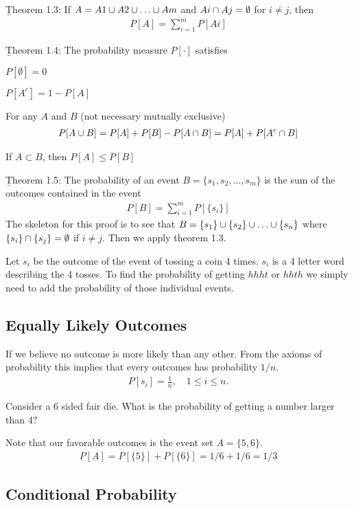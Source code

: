 \documentclass[12pt, titlepage, oneside]{article}
\begin{document}
\b{Theorem 1.3}: If $A = A1 \u A2 \u \dots \u Am$ and $Ai \cap Aj = \emptyset$ for $i \neq j$, then
\begin{align}
P[A] = \sum_{i=1}^m P[Ai]
\end{align}

\b{Theorem 1.4}: The probability measure $P[\cdot]$ satisfies
\items
\item $P[\emptyset] = 0$
\item $P[A^c] = 1-P[A]$
\item For any $A$ and $B$ (not necessary mutually exclusive)
\begin{align}
P[A \cup B] = P[A] + P [B] - P[A\cap B] = P[A] + P[A^c \cap B]
\end{align}
\item If $A \subset B$, then $P[A] \leq P[B]$
\eitems

\b{Theorem 1.5}: The probability of an event $B = \{s_1, s_2, \dots, s_m\}$ is the sum of the outcomes contained in the event
\begin{align}
P[B] = \sum_{i=1}^{m} P[\{s_i\}]
\end{align}
The skeleton for this proof is to see that $B = \{s_1\} \u \{s_2\} \u \dots \u \{s_n\}$ where $\{s_i\} \cap \{s_j\} = \emptyset$ if $i \neq j$. Then we apply theorem 1.3. 

\ex Let $s_i$ be the outcome of the event of tossing a coin 4 times. $s_i$ is a 4 letter word describing the 4 tosses. To find the probability of getting $hhht$ or $hhth$ we simply need to add the probability of those individual events.

\subsection{Equally Likely Outcomes}
If we believe no outcome is more likely than any other. From the axioms of probability this implies that every outcomes has probability $1/n$.
\begin{align}
P[s_i] = \frac{1}{n}, \enspace \enspace 1 \leq i \leq n.
\end{align}

\ex Consider a 6 sided fair die. What is the probability of getting a number larger than 4?

Note that our favorable outcomes is the event set $A = \{5,6\}$. 
\begin{align}
P[A] = P[\{5\}] + P[\{6\}] = 1/6 + 1/6 = 1/3
\end{align}

\subsection{Conditional Probability}
\end{document}

